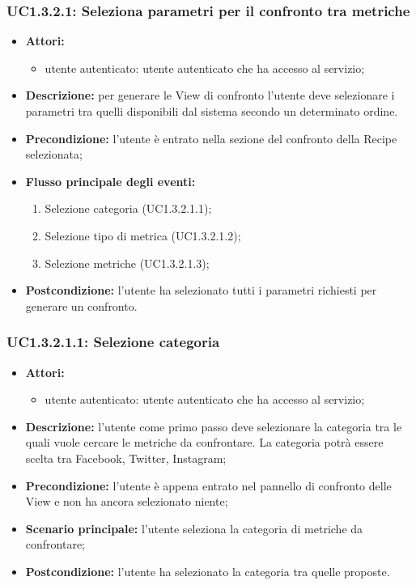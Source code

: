\subsubsection{UC1.3.2.1: Seleziona parametri per il confronto tra metriche}
\begin{itemize}
	\item \textbf{Attori:}
	\begin{itemize}
		\item utente autenticato: utente autenticato che ha accesso al servizio;
	\end{itemize}
	\item \textbf{Descrizione:} per generare le View di confronto l'utente deve selezionare i parametri tra quelli disponibili dal sistema secondo un determinato ordine.
	\item \textbf{Precondizione:} l'utente è entrato nella sezione del confronto della Recipe selezionata;
	\item \textbf{Flusso principale degli eventi:}
	\begin{enumerate}
		\item Selezione categoria (UC1.3.2.1.1);
		\item Selezione tipo di metrica (UC1.3.2.1.2);
		\item Selezione metriche (UC1.3.2.1.3);
	\end{enumerate}
	\item \textbf{Postcondizione:} l'utente ha selezionato tutti i parametri richiesti per generare un confronto.
\end{itemize}

\subsubsection{UC1.3.2.1.1: Selezione categoria}
\begin{itemize}
	\item \textbf{Attori:}
	\begin{itemize}
		\item utente autenticato: utente autenticato che ha accesso al servizio;
	\end{itemize}
	\item \textbf{Descrizione:} l'utente come primo passo deve selezionare la categoria tra le quali vuole cercare le metriche da confrontare. La categoria potrà essere scelta tra Facebook, Twitter, Instagram;
	\item \textbf{Precondizione:} l'utente è appena entrato nel pannello di confronto delle View e non ha ancora selezionato niente;
	\item \textbf{Scenario principale:} l'utente seleziona la categoria di metriche da confrontare;
	\item \textbf{Postcondizione:} l'utente ha selezionato la categoria tra quelle proposte.
\end{itemize}

